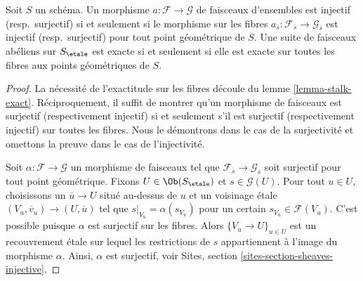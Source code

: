 \begin{theorem}
\label{theorem-exactness-stalks}
Soit $S$ un sch\'ema.
Un morphisme $a : \mathcal{F} \to \mathcal{G}$ de faisceaux d'ensembles est injectif
(resp.\ surjectif) si et seulement si le morphisme sur les fibres
$a_{\overline{s}} : \mathcal{F}_{\overline{s}} \to \mathcal{G}_{\overline{s}}$
est injectif (resp.\ surjectif) pour tout point g\'eom\'etrique de $S$.
Une suite de faisceaux ab\'eliens sur $S_\etale$ est exacte
si et seulement si elle est exacte sur toutes les fibres aux points g\'eom\'etriques de $S$.
\end{theorem}

\begin{proof}
La n\'ecessit\'e de l'exactitude sur les fibres d\'ecoule du
lemme \ref{lemma-stalk-exact}.
R\'eciproquement, il suffit de montrer qu'un morphisme de faisceaux est surjectif
(respectivement injectif) si et seulement s'il est surjectif (respectivement
injectif) sur toutes les fibres. Nous le d\'emontrons dans le cas de la surjectivit\'e et omettons
la preuve dans le cas de l'injectivit\'e.

\medskip\noindent
Soit $\alpha : \mathcal{F} \to \mathcal{G}$ un morphisme de faisceaux tel
que $\mathcal{F}_{\overline{s}} \to \mathcal{G}_{\overline{s}}$
soit surjectif pour tout point g\'eom\'etrique. Fixons
$U \in \Ob(S_\etale)$
et $s \in \mathcal{G}(U)$. Pour tout $u \in U$, choisissons un
$\overline{u} \to U$ situ\'e au-dessus de $u$ et un voisinage \'etale
$(V_u , \overline{v}_u) \to (U, \overline{u})$ tel que
$s|_{V_u} = \alpha(s_{V_u})$ pour un certain
$s_{V_u} \in \mathcal{F}(V_u)$.
C'est possible puisque $\alpha$ est surjectif sur les
fibres. Alors $\{V_u \to U\}_{u \in U}$
est un recouvrement \'etale sur lequel les restrictions de $s$
appartiennent \`a l'image du morphisme $\alpha$.
Ainsi, $\alpha$ est surjectif, voir
Sites, section \ref{sites-section-sheaves-injective}.
\end{proof}

